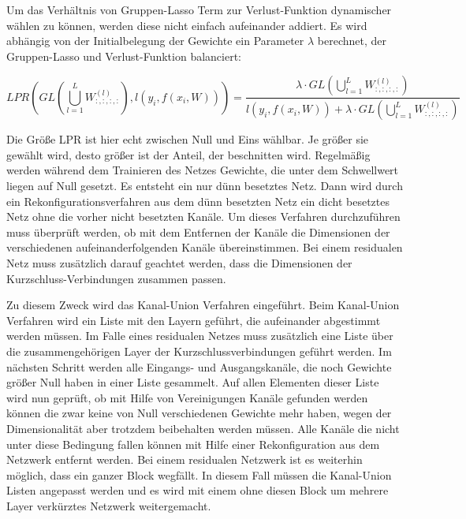 Um das Verhältnis von Gruppen-Lasso Term zur Verlust-Funktion dynamischer wählen zu können, werden diese nicht einfach aufeinander addiert. Es wird abhängig von der Initialbelegung der Gewichte ein Parameter $\lambda$  berechnet, der Gruppen-Lasso und Verlust-Funktion balanciert:

\begin{equation}
 LPR(GL(\bigcup_{l=1}^{L} W_{:,:,:,:}^{(l)}),l(y_i,f(x_i,W))) = \frac{\lambda \cdot GL(\bigcup_{l=1}^{L} W_{:,:,:,:}^{(l)})}{l(y_i,f(x_i,W)) + \lambda \cdot GL(\bigcup_{l=1}^{L} W_{:,:,:,:}^{(l)})}           
\end{equation}

Die Größe LPR ist hier echt zwischen Null und Eins wählbar. Je größer sie gewählt wird, desto größer ist der Anteil, der beschnitten wird. Regelmäßig werden während dem Trainieren des Netzes Gewichte, die unter dem Schwellwert liegen auf Null gesetzt. Es entsteht ein nur dünn besetztes Netz. Dann wird durch ein Rekonfigurationsverfahren aus dem dünn besetzten Netz ein dicht besetztes Netz ohne die vorher nicht besetzten Kanäle. Um dieses Verfahren durchzuführen muss überprüft werden, ob mit dem Entfernen der Kanäle die Dimensionen der verschiedenen aufeinanderfolgenden Kanäle übereinstimmen. Bei einem residualen Netz muss zusätzlich darauf geachtet werden, dass die Dimensionen der Kurzschluss-Verbindungen zusammen passen.


Zu diesem Zweck wird das Kanal-Union Verfahren eingeführt. Beim Kanal-Union Verfahren wird ein Liste mit den Layern geführt, die aufeinander abgestimmt werden müssen. Im Falle eines residualen Netzes muss zusätzlich eine Liste über die zusammengehörigen Layer der Kurzschlussverbindungen geführt werden. Im nächsten Schritt werden alle Eingangs- und Ausgangskanäle, die noch Gewichte größer Null haben in einer Liste gesammelt. Auf allen Elementen dieser Liste wird nun geprüft, ob mit Hilfe von Vereinigungen Kanäle gefunden werden können die zwar keine von Null verschiedenen Gewichte mehr haben, wegen der Dimensionalität aber trotzdem beibehalten werden müssen. Alle Kanäle die nicht unter diese Bedingung fallen können mit Hilfe einer Rekonfiguration aus dem Netzwerk entfernt werden. 
Bei einem residualen Netzwerk ist es weiterhin möglich, dass ein ganzer Block wegfällt. In diesem Fall müssen die Kanal-Union Listen angepasst werden und es wird mit einem ohne diesen Block um mehrere Layer verkürztes Netzwerk weitergemacht.


